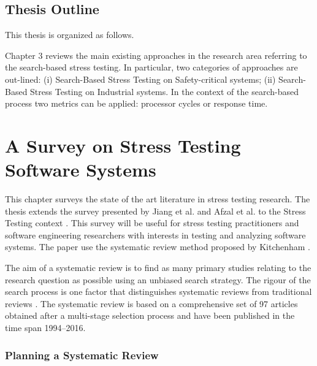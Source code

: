\documentclass{report}
\begin{document}
\section{Thesis Outline}

This thesis is organized as follows. 

Chapter 3 reviews the main existing approaches in the research area referring to the search-based stress testing. In particular, two categories of approaches are out-lined: (i) Search-Based Stress Testing on Safety-critical systems; (ii) Search-Based Stress Testing on Industrial systems. In the context of the search-based process two metrics can be applied: processor cycles or response time.

\chapter{A Survey on Stress Testing Software Systems}


This chapter surveys the state of the art literature in stress testing research. The thesis extends the survey presented by Jiang et al. \cite{Jiang2010}  and Afzal et al. \cite{Afzal2009a} to the Stress Testing context .  This survey will be useful for stress testing practitioners and software engineering researchers with interests in testing and analyzing software systems. The paper use the systematic review method proposed by Kitchenham \cite{Kitchenham2007b}.



The aim of a systematic review is to find as many primary studies relating to the research question as possible using an unbiased search strategy. The rigour of the search process is one factor that distinguishes systematic reviews from traditional reviews \cite{Kitchenham2007b}. The systematic review is based on a comprehensive set of 97 articles obtained after a multi-stage selection process and have been published in the time span 1994–2016.




\subsection{Planning a Systematic Review}
\end{document}
